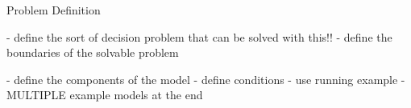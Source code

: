 Problem Definition

- define the sort of decision problem that can be solved with this!!
- define the boundaries of the solvable problem

- define the components of the model
- define conditions
- use running example
- MULTIPLE example models at the end